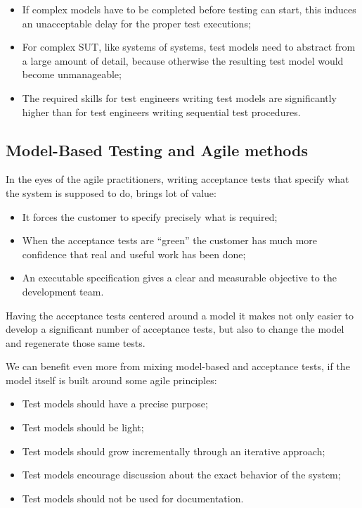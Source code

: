 \begin{itemize}
\item If complex models have to be completed before testing
can start, this induces an unacceptable delay for the
proper test executions;
\item For complex SUT, like systems of systems, test models 
need to abstract from a large amount of detail, because 
otherwise the resulting test model would become unmanageable;
\item The required skills for test engineers writing test 
models are significantly higher than for test engineers 
writing sequential test procedures.
\end{itemize}

\subsection{Model-Based Testing and Agile methods}
In the eyes of the agile practitioners, writing acceptance tests
that specify what the system is supposed to do, brings lot of value:
\begin{itemize}
\item It forces the customer to specify precisely what is required;
\item When the acceptance tests are “green” the customer has much 
more confidence that real and useful work has been done;
\item An executable specification gives a clear and measurable 
objective to the development team.
\end{itemize}

Having the acceptance tests centered around a model it makes 
not only easier to develop a significant number of acceptance tests,
but also to change the model and regenerate those same tests.

We can benefit even more from mixing model-based and acceptance tests, if the model itself is built around some agile principles:
\begin{itemize}
\item Test models should have a precise purpose;
\item Test models should be light; 
\item Test models should grow incrementally through an iterative approach;
\item Test models encourage discussion about the exact behavior of the system;
\item Test models should not be used for documentation.
\end{itemize}

